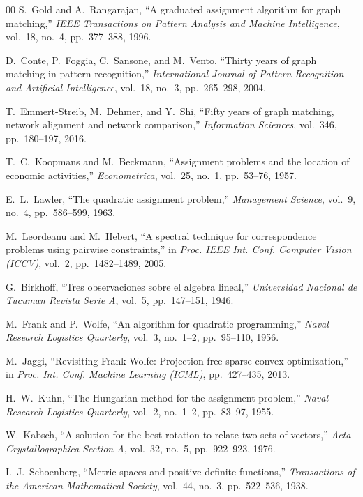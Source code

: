 \documentclass[conference]{IEEEtran}
\begin{document}
\begin{thebibliography}{00}
S.~Gold and A.~Rangarajan,
``A graduated assignment algorithm for graph matching,''
\textit{IEEE Transactions on Pattern Analysis and Machine Intelligence},
vol.~18, no.~4, pp.~377--388, 1996.

D.~Conte, P.~Foggia, C.~Sansone, and M.~Vento,
``Thirty years of graph matching in pattern recognition,''
\textit{International Journal of Pattern Recognition and Artificial Intelligence},
vol.~18, no.~3, pp.~265--298, 2004.

T.~Emmert-Streib, M.~Dehmer, and Y.~Shi,
``Fifty years of graph matching, network alignment and network comparison,''
\textit{Information Sciences},
vol.~346, pp.~180--197, 2016.

T.~C.~Koopmans and M.~Beckmann,
``Assignment problems and the location of economic activities,''
\textit{Econometrica},
vol.~25, no.~1, pp.~53--76, 1957.

E.~L.~Lawler,
``The quadratic assignment problem,''
\textit{Management Science},
vol.~9, no.~4, pp.~586--599, 1963.

M.~Leordeanu and M.~Hebert,
``A spectral technique for correspondence problems using pairwise constraints,''
in \textit{Proc. IEEE Int. Conf. Computer Vision (ICCV)},
vol.~2, pp.~1482--1489, 2005.

G.~Birkhoff,
``Tres observaciones sobre el algebra lineal,''
\textit{Universidad Nacional de Tucuman Revista Serie A},
vol.~5, pp.~147--151, 1946.

M.~Frank and P.~Wolfe,
``An algorithm for quadratic programming,''
\textit{Naval Research Logistics Quarterly},
vol.~3, no.~1--2, pp.~95--110, 1956.

M.~Jaggi,
``Revisiting Frank-Wolfe: Projection-free sparse convex optimization,''
in \textit{Proc. Int. Conf. Machine Learning (ICML)},
pp.~427--435, 2013.

H.~W.~Kuhn,
``The Hungarian method for the assignment problem,''
\textit{Naval Research Logistics Quarterly},
vol.~2, no.~1--2, pp.~83--97, 1955.

W.~Kabsch,
``A solution for the best rotation to relate two sets of vectors,''
\textit{Acta Crystallographica Section A},
vol.~32, no.~5, pp.~922--923, 1976.

I.~J.~Schoenberg,
``Metric spaces and positive definite functions,''
\textit{Transactions of the American Mathematical Society},
vol.~44, no.~3, pp.~522--536, 1938.


\end{thebibliography}
\end{document}
